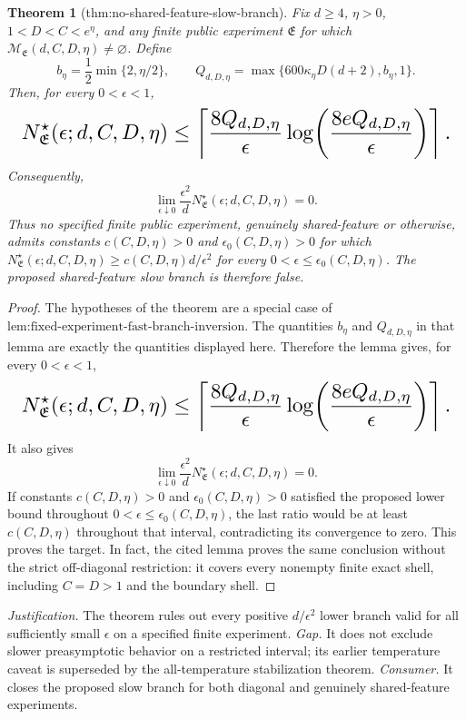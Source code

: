 \documentclass{article}
\newtheorem{theorem}{Theorem}
\begin{document}
\begin{theorem}[thm:no-shared-feature-slow-branch]\label{thm:no-shared-feature-slow-branch}
Fix \(d\ge4\), \(\eta>0\), \(1<D<C<e^\eta\), and any finite public experiment \(\mathfrak E\) for which \(\mathcal M_{\mathfrak E}(d,C,D,\eta)\ne\varnothing\). Define
\[
b_\eta=\frac12\min\{2,\eta/2\},\qquad
Q_{d,D,\eta}=\max\{600\kappa_\eta D(d+2),b_\eta,1\}.
\]
Then, for every \(0<\epsilon<1\),
\[
\makebox[\linewidth][c]{\resizebox{0.98\linewidth}{!}{\(\displaystyle N^\star_{\mathfrak E}(\epsilon;d,C,D,\eta)
\le
\left\lceil\frac{8Q_{d,D,\eta}}{\epsilon}
\log\!\left(\frac{8eQ_{d,D,\eta}}{\epsilon}\right)\right\rceil .\)}}
\]
Consequently,
\[
\lim_{\epsilon\downarrow0}
\frac{\epsilon^2}{d}N^\star_{\mathfrak E}(\epsilon;d,C,D,\eta)=0.
\]
Thus no specified finite public experiment, genuinely shared-feature or otherwise, admits constants \(c(C,D,\eta)>0\) and \(\epsilon_0(C,D,\eta)>0\) for which \(N^\star_{\mathfrak E}(\epsilon;d,C,D,\eta)\ge c(C,D,\eta)d/\epsilon^2\) for every \(0<\epsilon\le\epsilon_0(C,D,\eta)\). The proposed shared-feature slow branch is therefore false.
\end{theorem}
\begin{proof}
The hypotheses of the theorem are a special case of \(\text{lem:fixed-experiment-fast-branch-inversion}\). The quantities \(b_\eta\) and \(Q_{d,D,\eta}\) in that lemma are exactly the quantities displayed here. Therefore the lemma gives, for every \(0<\epsilon<1\),
\[
\makebox[\linewidth][c]{\resizebox{0.98\linewidth}{!}{\(\displaystyle N^\star_{\mathfrak E}(\epsilon;d,C,D,\eta)
\le
\left\lceil\frac{8Q_{d,D,\eta}}{\epsilon}
\log\!\left(\frac{8eQ_{d,D,\eta}}{\epsilon}\right)\right\rceil .\)}}
\]
It also gives
\[
\lim_{\epsilon\downarrow0}\frac{\epsilon^2}{d}N^\star_{\mathfrak E}(\epsilon;d,C,D,\eta)=0.
\]
If constants \(c(C,D,\eta)>0\) and \(\epsilon_0(C,D,\eta)>0\) satisfied the proposed lower bound throughout \(0<\epsilon\le\epsilon_0(C,D,\eta)\), the last ratio would be at least \(c(C,D,\eta)\) throughout that interval, contradicting its convergence to zero. This proves the target. In fact, the cited lemma proves the same conclusion without the strict off-diagonal restriction: it covers every nonempty finite exact shell, including \(C=D>1\) and the boundary shell.
\end{proof}
\par\smallskip\noindent \textit{Justification.} The theorem rules out every positive \(d/\epsilon^2\) lower branch valid for all sufficiently small \(\epsilon\) on a specified finite experiment. \textit{Gap.} It does not exclude slower preasymptotic behavior on a restricted interval; its earlier temperature caveat is superseded by the all-temperature stabilization theorem. \textit{Consumer.} It closes the proposed slow branch for both diagonal and genuinely shared-feature experiments.
\end{document}
